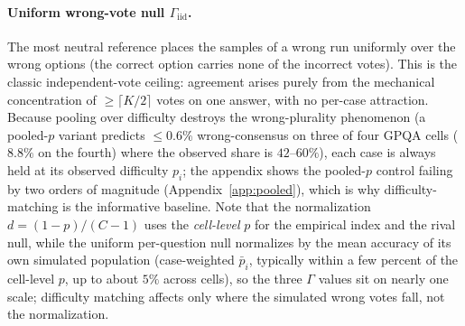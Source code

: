 \documentclass{article}
\newcommand{\agreementIndex}{\Gamma}
\begin{document}
\paragraph{Uniform wrong-vote null $\agreementIndex_{\mathrm{iid}}$.}
The most neutral reference places the samples of a wrong run
uniformly over the wrong options (the correct option carries none of the
incorrect votes). This is the classic independent-vote ceiling: agreement
arises purely from the mechanical concentration of $\ge\lceil K/2\rceil$
votes on one answer, with no per-case attraction. Because pooling over
difficulty destroys the wrong-plurality phenomenon (a pooled-$p$ variant
predicts $\le0.6\%$ wrong-consensus on three of four GPQA cells
($8.8\%$ on the fourth) where the observed
share is $42$--$60\%$), each case is always held at its observed
difficulty $p_i$; the appendix shows the pooled-$p$ control failing by
two orders of magnitude (Appendix~\ref{app:pooled}), which is why difficulty-matching is the
informative baseline. Note that the normalization $d=(1-p)/(C-1)$ uses
the \emph{cell-level} $p$ for the empirical index and the rival null,
while the uniform per-question null normalizes by the mean accuracy of
its own simulated population (case-weighted $\bar p_i$, typically within
a few percent of the cell-level $p$, up to about $5\%$ across cells), so
the three $\agreementIndex$ values sit on
nearly one scale; difficulty matching
affects only where the simulated wrong votes fall, not the normalization.
\end{document}

